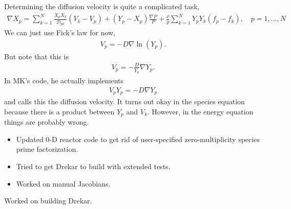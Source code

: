 \documentclass[fontsize=11pt, %
               paper=a4, %
               oneside, %
               captions=tableheading,
               index=totoc,
               hyperref]{labbook}
\newcommand{\lr}[1]{\left(#1\right)}
\begin{document}
\begin{tcolorbox}[colback=green!5,colframe=green!40!black,title=A note on the diffusion velocity:]
Determining the diffusion velocity is quite a complicated task,
\begin{align*}
  \nabla X_{p} = \sum_{k=1}^{N}{\frac{X_{p}X_{k}}{\mathcal{D}_{pk}}\lr{V_{k} - V_{p}}} + \lr{Y_{p} - X_{p}}\frac{\nabla P}{P} + \frac{\rho}{p}\sum_{k=1}^{N}{Y_{p}Y_{k}\lr{f_{p} - f_{k}}}, \quad  p = 1,\ldots,N
\end{align*}
We can just use Fick's law for now,
\begin{align*}
  V_{p} = -D\nabla\ln\lr{Y_{p}}.
\end{align*}
But note that this is
\begin{align*}
  V_{p} = -\frac{D}{Y_{p}}\nabla Y_{p}.
\end{align*}
In MK's code, he actually implements
\begin{align*}
  V_{p}Y_{p} = -D\nabla Y_{p}
\end{align*}
and calls this the diffusion velocity.  It turns out okay in the species equation because there is a product between $Y_{p}$ and $V_{k}$.  However, in the energy equation things are probably wrong.
\end{tcolorbox}


\begin{itemize}
  \item Updated 0-D reactor code to get rid of user-specified zero-multiplicity species prime factorization.
  \item Tried to get Drekar to build with extended tests.
  \item Worked on manual Jacobians.
\end{itemize}

Worked on building Drekar.
\end{document}
